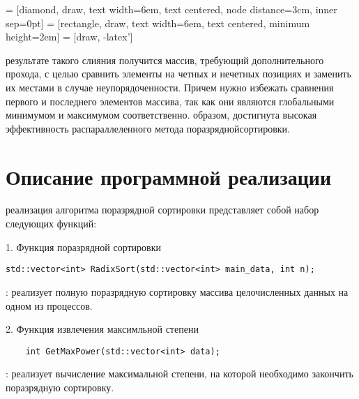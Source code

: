 \documentclass[12pt]{report}
\begin{document}
 = [diamond, draw, text width=6em, text centered,
node distance=3cm, inner sep=0pt]
 = [rectangle, draw, text width=6em, text centered,
minimum height=2em]
 = [draw, -latex']


 результате такого слияния получится массив, требующий дополнительного прохода, с целью сравнить элементы на четных и нечетных позициях и заменить их местами в случае неупорядоченности. Причем нужно избежать сравнения первого и последнего элементов массива, так как они являются глобальными минимумом и максимумом соответственно.
 образом, достигнута высокая эффективность распараллеленного метода поразряднойсортировки.

\newpage


\section*{Описание программной реализации}
 реализация алгоритма поразрядной сортировки представляет собой набор следующих функций:
\par 1. Функция поразрядной сортировки
\begin{lstlisting}
std::vector<int> RadixSort(std::vector<int> main_data, int n);
\end{lstlisting}
: реализует полную поразрядную сортировку массива целочисленных данных на одном из процессов.

\par 2. Функция извлечения максимльной степени
\begin{lstlisting}
    int GetMaxPower(std::vector<int> data);
\end{lstlisting}
: реализует вычисление максимальной степени, на которой необходимо закончить поразрядную сортировку.
\end{document}
